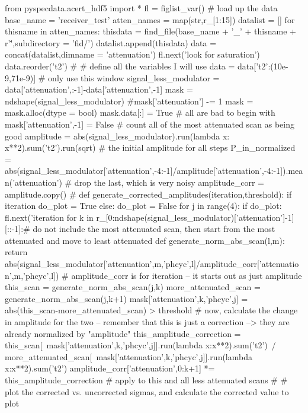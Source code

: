 \begin{python}
from pyspecdata.acert_hdf5 import *
fl = figlist_var()
#{{{ load up the data
base_name = 'receiver_test'
atten_names = map(str,r_[1:15])
datalist = []
for thisname in atten_names:
    thisdata = find_file(base_name + '_' + thisname + r'\.',subdirectory = 'fid/')
    datalist.append(thisdata)
data = concat(datalist,dimname = 'attenuation')
fl.next('look for saturation')
data.reorder('t2')
#}}}
#{{{ define all the variables I will use
data = data['t2':(10e-9,71e-9)] # only use this window
signal_less_modulator = data['attenuation',:-1]-data['attenuation',-1]
mask = ndshape(signal_less_modulator)
#mask['attenuation'] -= 1
mask = mask.alloc(dtype = bool)
mask.data[:] = True # all are bad to begin with
mask['attenuation',-1] = False # count all of the most attenuated scan as being good
amplitude = abs(signal_less_modulator).run(lambda x: x**2).sum('t2').run(sqrt) # the initial amplitude for all steps
P_in_normalized = abs(signal_less_modulator['attenuation',-4:-1]/amplitude['attenuation',-4:-1]).mean('attenuation') # drop the last, which is very noisy
amplitude_corr = amplitude.copy()
#}}}
def generate_corrected_amplitudes(iteration,threshold):
    if iteration %
        do_plot = True
    else:
        do_plot = False
    for j in range(4):
        if do_plot: fl.next('iteration %
        for k in r_[0:ndshape(signal_less_modulator)['attenuation']-1][::-1]:# do not include the most attenuated scan, then start from the most attenuated and move to least attenuated
            def generate_norm_abs_scan(l,m):
                return abs(signal_less_modulator['attenuation',m,'phcyc',l]/amplitude_corr['attenuation',m,'phcyc',l]) # amplitude_corr is for iteration -- it starts out as just amplitude
            this_scan = generate_norm_abs_scan(j,k)
            more_attenuated_scan = generate_norm_abs_scan(j,k+1)
            mask['attenuation',k,'phcyc',j] = abs(this_scan-more_attenuated_scan) > threshold
            #{{{ now, calculate the change in amplitude for the two -- remember that this is just a correction --> they are already normalized by "amplitude"
            this_amplitude_correction = this_scan[~mask['attenuation',k,'phcyc',j]].run(lambda x:x**2).sum('t2')\
                    / more_attenuated_scan[~mask['attenuation',k,'phcyc',j]].run(lambda x:x**2).sum('t2')
            amplitude_corr['attenuation',0:k+1] *= this_amplitude_correction # apply to this and all less attenuated scans
            #}}}
        #{{{ plot the corrected vs. uncorrected sigmas, and calculate the corrected value to plot
}}}
\end{python}
